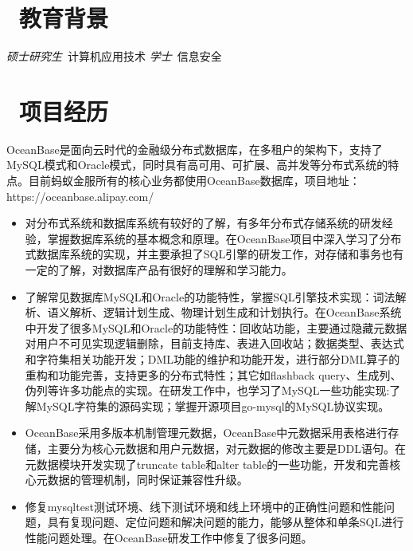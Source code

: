 \documentclass{resume}
\begin{document}


\section{\faGraduationCap\  教育背景}
\textit{硕士研究生}\ 计算机应用技术
\datedsubsection{\textbf{电子科技大学}}{2009 -- 2013}
\textit{学士}\ 信息安全\

\section{\faUsers\ 项目经历}
OceanBase是面向云时代的金融级分布式数据库，在多租户的架构下，支持了MySQL模式和Oracle模式，同时具有高可用、可扩展、高并发等分布式系统的特点。目前蚂蚁金服所有的核心业务都使用OceanBase数据库，项目地址：https://oceanbase.alipay.com/
\begin{itemize}
  \item 对分布式系统和数据库系统有较好的了解，有多年分布式存储系统的研发经验，掌握数据库系统的基本概念和原理。在OceanBase项目中深入学习了分布式数据库系统的实现，并主要承担了SQL引擎的研发工作，对存储和事务也有一定的了解，对数据库产品有很好的理解和学习能力。
  \item 了解常见数据库MySQL和Oracle的功能特性，掌握SQL引擎技术实现：词法解析、语义解析、逻辑计划生成、物理计划生成和计划执行。在OceanBase系统中开发了很多MySQL和Oracle的功能特性：回收站功能，主要通过隐藏元数据对用户不可见实现逻辑删除，目前支持库、表进入回收站；数据类型、表达式和字符集相关功能开发；DML功能的维护和功能开发，进行部分DML算子的重构和功能完善，支持更多的分布式特性；其它如flashback query、生成列、伪列等许多功能点的实现。在研发工作中，也学习了MySQL一些功能实现:了解MySQL字符集的源码实现；掌握开源项目go-mysql的MySQL协议实现。
  \item OceanBase采用多版本机制管理元数据，OceanBase中元数据采用表格进行存储，主要分为核心元数据和用户元数据，对元数据的修改主要是DDL语句。在元数据模块开发实现了truncate table和alter table的一些功能，开发和完善核心元数据的管理机制，同时保证兼容性升级。
  \item 修复mysqltest测试环境、线下测试环境和线上环境中的正确性问题和性能问题，具有复现问题、定位问题和解决问题的能力，能够从整体和单条SQL进行性能问题处理。在OceanBase研发工作中修复了很多问题。
\end{itemize}
\end{document}

